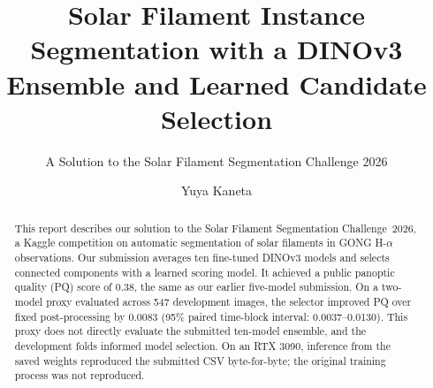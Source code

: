 \documentclass[sigconf]{acmart}
\begin{document}
\title[Filament Segmentation with a DINOv3 Ensemble]{Solar Filament Instance Segmentation with a DINOv3 Ensemble and Learned Candidate Selection}  %
\subtitle{A Solution to the Solar Filament Segmentation Challenge 2026} %


\author{Yuya Kaneta} 


\begin{abstract}
    This report describes our solution to the Solar Filament Segmentation Challenge~2026, a Kaggle competition on automatic segmentation of solar filaments in GONG H-$\alpha$ observations. Our submission averages ten fine-tuned DINOv3 models and selects connected components with a learned scoring model. It achieved a public panoptic quality (PQ) score of 0.38, the same as our earlier five-model submission. On a two-model proxy evaluated across 547 development images, the selector improved PQ over fixed post-processing by 0.0083 (95\% paired time-block interval: 0.0037--0.0130). This proxy does not directly evaluate the submitted ten-model ensemble, and the development folds informed model selection. On an RTX 3090, inference from the saved weights reproduced the submitted CSV byte-for-byte; the original training process was not reproduced.
\end{abstract}

\maketitle

\ifguideStyle
{}
\par\medskip
\fi
\end{document}
